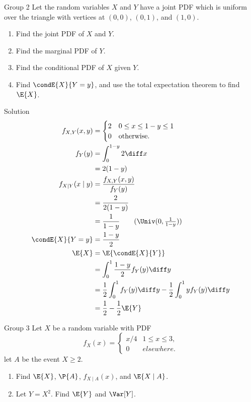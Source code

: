 \documentclass{article}
\theoremstyle{plain}
\theoremstyle{definition}
\theoremstyle{remark}
\begin{document}
\begin{problem}
    {Group 2}
    Let the random variables $X$ and $Y$ have a joint PDF which is uniform over the triangle with vertices at $(0, 0)$, $(0, 1)$, and $(1, 0)$.
    \begin{enumerate}
        \item Find the joint PDF of $X$ and $Y$.
        \item Find the marginal PDF of $Y$.
        \item Find the conditional PDF of $X$ given $Y$.
        \item Find $\condE{X}{Y = y}$, and use the total expectation theorem to find $\E{X}$.
    \end{enumerate}
\end{problem}

\begin{solution}
    {Solution}
    \begin{align*}
        f_{X,Y}(x,y) &= {
            \begin{cases}
                2 & 0 \leq x \leq 1-y \leq 1 \\
                0 & \text{otherwise.}
            \end{cases}
        } \\
        f_Y(y) &= \int_{0}^{1-y}2\diff x \\
        &= 2(1-y) \\
        f_{X\mid Y}(x\mid y) &= \frac{f_{X,Y}(x,y)}{f_Y(y)} \\
        &= \frac{2}{2(1-y)} \\
        &= \frac{1}{1-y} \tag{$\Univ(0,\frac{1}{1-y})$}\\
        \condE{X}{Y=y} &= \frac{1-y}{2} \\
        \E{X} &= \E{\condE{X}{Y}} \\
        &= \int_{0}^{1}\frac{1-y}{2}f_Y{(y)}\diff y \\
        &= \frac{1}{2}\int_{0}^{1}f_Y(y)\diff y - \frac{1}{2}\int_{0}^{1}yf_Y(y)\diff y\\
        &= \frac{1}{2}-\frac{1}{2}\E{Y} \\
    \end{align*}
\end{solution}

\begin{problem}
    {Group 3}
    Let $X$ be a random variable with PDF
    \[
        f_X(x) = {
            \begin{cases}
                x/4 & 1 \leq x \leq 3,\\
                0 & elsewhere.
            \end{cases}
        }
    \]
    let $A$ be the event ${X \geq 2}$.
    \begin{enumerate}
        \item Find $\E{X}$, $\P{A}$, $f_{X\mid A}(x)$, and $\E{X \mid A}$.
        \item Let $Y = X^2$. Find $\E{Y}$ and $\Var[Y]$.
    \end{enumerate}
\end{problem}
\end{document}
